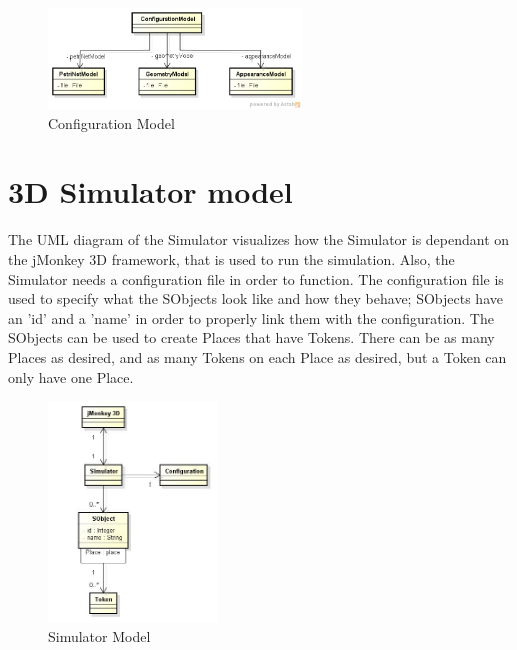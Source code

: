 \documentclass[11pt]{article}   %
\begin{document}
\begin{figure}[htp]
\begin{center}
  \includegraphics[width=0.6\textwidth]{image/configuration_model.png}
  \caption{Configuration Model}
  \label{fig:configuration_model}
\end{center}
\end{figure}

\newpage
\section{3D Simulator model}

The UML diagram of the Simulator visualizes how the Simulator is dependant on the jMonkey 3D framework, that is used to run the simulation. Also, the Simulator needs a configuration file in order to function. The configuration file is used to specify what the SObjects look like and how they behave; SObjects have an 'id' and a 'name' in order to properly link them with the configuration. The SObjects can be used to create Places that have Tokens. There can be as many Places as desired, and as many Tokens on each Place as desired, but a Token can only have one Place.

\begin{figure}[htp]
\begin{center}
  \includegraphics[width=0.4\textwidth]{image/simulator_model.jpg}
  \caption{Simulator Model}
  \label{fig:simulator_model}
\end{center}
\end{figure}

\printindex
\end{document}
